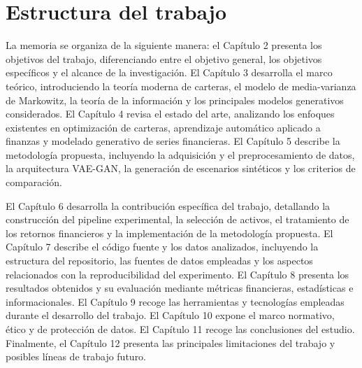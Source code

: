\section{Estructura del trabajo}

La memoria se organiza de la siguiente manera: el Capítulo 2 presenta los objetivos del trabajo, diferenciando entre el objetivo general, los objetivos específicos y el alcance de la investigación. El Capítulo 3 desarrolla el marco teórico, introduciendo la teoría moderna de carteras, el modelo de media-varianza de Markowitz, la teoría de la información y los principales modelos generativos considerados. El Capítulo 4 revisa el estado del arte, analizando los enfoques existentes en optimización de carteras, aprendizaje automático aplicado a finanzas y modelado generativo de series financieras. El Capítulo 5 describe la metodología propuesta, incluyendo la adquisición y el preprocesamiento de datos, la arquitectura VAE-GAN, la generación de escenarios sintéticos y los criterios de comparación.

El Capítulo 6 desarrolla la contribución específica del trabajo, detallando la construcción del pipeline experimental, la selección de activos, el tratamiento de los retornos financieros y la implementación de la metodología propuesta. El Capítulo 7 describe el código fuente y los datos analizados, incluyendo la estructura del repositorio, las fuentes de datos empleadas y los aspectos relacionados con la reproducibilidad del experimento. El Capítulo 8 presenta los resultados obtenidos y su evaluación mediante métricas financieras, estadísticas e informacionales. El Capítulo 9 recoge las herramientas y tecnologías empleadas durante el desarrollo del trabajo. El Capítulo 10 expone el marco normativo, ético y de protección de datos. El Capítulo 11 recoge las conclusiones del estudio. Finalmente, el Capítulo 12 presenta las principales limitaciones del trabajo y posibles líneas de trabajo futuro.
